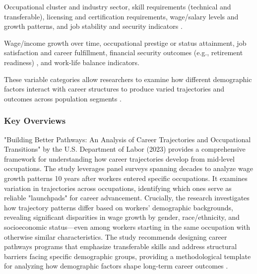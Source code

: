\documentclass[../main.tex]{subfiles}
\begin{document}
Occupational cluster and industry sector, skill requirements (technical and transferable), licensing and certification requirements, wage/salary levels and growth patterns, and job stability and security indicators \parencite{dol2023building}.

Wage/income growth over time, occupational prestige or status attainment, job satisfaction and career fulfillment, financial security outcomes (e.g., retirement readiness) \parencite{lee2023middle}, and work-life balance indicators.

These variable categories allow researchers to examine how different demographic factors interact with career structures to produce varied trajectories and outcomes across population segments \parencite{questionpro2024demographic}.

\subsubsection{Key Overviews}

"Building Better Pathways: An Analysis of Career Trajectories and Occupational Transitions" by the U.S. Department of Labor (2023) provides a comprehensive framework for understanding how career trajectories develop from mid-level occupations. The study leverages panel surveys spanning decades to analyze wage growth patterns 10 years after workers entered specific occupations. It examines variation in trajectories across occupations, identifying which ones serve as reliable "launchpads" for career advancement. Crucially, the research investigates how trajectory patterns differ based on workers' demographic backgrounds, revealing significant disparities in wage growth by gender, race/ethnicity, and socioeconomic status—even among workers starting in the same occupation with otherwise similar characteristics. The study recommends designing career pathways programs that emphasize transferable skills and address structural barriers facing specific demographic groups, providing a methodological template for analyzing how demographic factors shape long-term career outcomes \parencite{dol2023building}.
\end{document}
